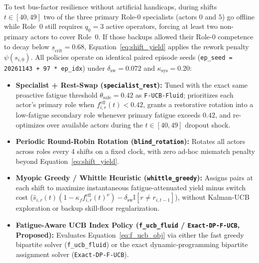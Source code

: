 \documentclass[11pt]{article}
\begin{document}
To test bus-factor resilience without artificial handicaps, during shifts $t \in [40, 49]$ two of the three primary Role-0 specialists (actors $0$ and $5$) go offline while Role~0 still requires $q_0 = 3$ active operators, forcing at least two non-primary actors to cover Role~0. If those backups allowed their Role-0 competence to decay below $\underline{s}_{\mathrm{crit}} = 0.68$, Equation~\eqref{eq:shift_yield} applies the rework penalty $\psi(s_{i,0})$. All policies operate on identical paired episode seeds (\texttt{ep\_\linebreak[0]seed = 20261143 + 97 * ep\_\linebreak[0]idx}) under $\delta_{\mathrm{sw}} = 0.072$ and $\kappa_{\mathrm{sys}} = 0.20$:
\begin{itemize}
  \item \textbf{Specialist + Rest-Swap (\texttt{specialist\_\linebreak[0]rest}):} Tuned with the exact same proactive fatigue threshold $\theta_{\mathrm{safe}} = 0.42$ as \texttt{F-UCB-Fluid}; prioritizes each actor's primary role when $f_{i,r}^{\mathrm{eff}}(t) < 0.42$, grants a restorative rotation into a low-fatigue secondary role whenever primary fatigue exceeds $0.42$, and re-optimizes over available actors during the $t \in [40, 49]$ dropout shock.
  \item \textbf{Periodic Round-Robin Rotation (\texttt{blind\_\linebreak[0]rotation}):} Rotates all actors across roles every 4 shifts on a fixed clock, with zero ad-hoc mismatch penalty beyond Equation~\eqref{eq:shift_yield}.
  \item \textbf{Myopic Greedy / Whittle Heuristic (\texttt{whittle\_\linebreak[0]greedy}):} Assigns pairs at each shift to maximize instantaneous fatigue-attenuated yield minus switch cost ($\hat{s}_{i,r}(t)(1 - \kappa_f f_{i,r}^{\mathrm{eff}}(t)^{\nu}) - \delta_{\mathrm{sw}}\mathbb{I}[r \neq r_{i,t-1}]$), without Kalman-UCB exploration or backup skill-floor regularization.
  \item \textbf{Fatigue-Aware UCB Index Policy (\texttt{f\_\linebreak[0]ucb\_\linebreak[0]fluid} / \texttt{Exact-DP-F-UCB}, Proposed):} Evaluates Equation~\eqref{eq:f_ucb_obj} via either the fast greedy bipartite solver (\texttt{f\_\linebreak[0]ucb\_\linebreak[0]fluid}) or the exact dynamic-programming bipartite assignment solver (\texttt{Exact-DP-F-UCB}).
\end{itemize}
\end{document}
